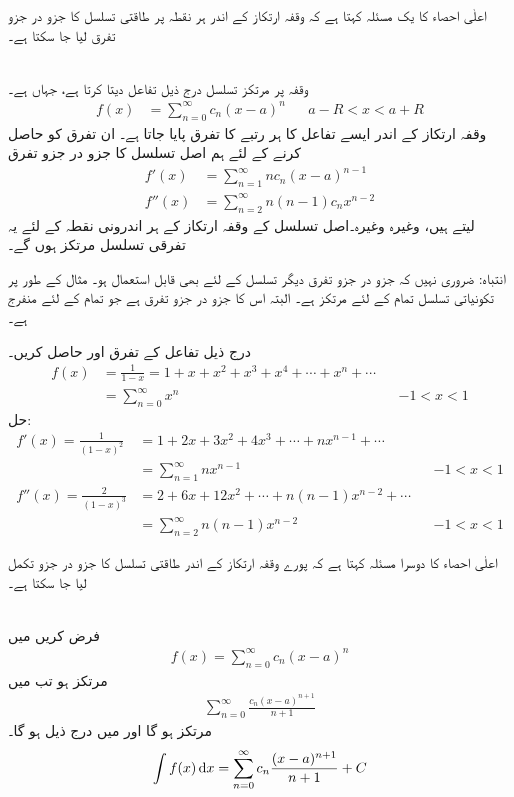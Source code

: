 اعلٰی احصاء کا یک مسئلہ کہتا ہے کہ وقفہ ارتکاز کے اندر ہر نقطہ پر طاقتی تسلسل کا جزو در جزو تفرق لیا جا سکتا ہے۔

\\
وقفہ   پر مرتکز تسلسل  درج ذیل تفاعل  دیتا کرتا ہے، جہاں  ہے۔
\begin{align*}
f(x)&=\sum_{n=0}^{\infty}c_n(x-a)^n&&a-R<x<a+R
\end{align*}
وقفہ ارتکاز کے اندر ایسے تفاعل کا ہر رتبے کا تفرق پایا جاتا ہے۔ ان تفرق کو حاصل کرنے کے لئے ہم اصل تسلسل کا جزو در جزو تفرق
\begin{align*}
f'(x)&=\sum_{n=1}^{\infty}nc_n(x-a)^{n-1}\\
f''(x)&=\sum_{n=2}^{\infty}n(n-1)c_nx^{n-2}
\end{align*}
لیتے ہیں، وغیرہ وغیرہ۔اصل تسلسل کے وقفہ ارتکاز کے ہر اندرونی نقطہ کے لئے یہ تفرقی تسلسل مرتکز ہوں گے۔

انتباہ: ضروری نہیں کہ جزو در جزو تفرق دیگر تسلسل کے لئے بھی قابل استعمال ہو۔ مثال کے طور پر تکونیاتی تسلسل  تمام  کے لئے مرتکز ہے۔ البتہ اس کا جزو در جزو تفرق   ہے جو تمام  کے لئے منفرج ہے۔

درج ذیل تفاعل  کے تفرق  اور  حاصل کریں۔
\begin{align*}
f(x)&=\frac{1}{1-x}=1+x+x^2+x^3+x^4+\cdots+x^n+\cdots\\
&=\sum_{n=0}^{\infty}x^n&&-1<x<1
\end{align*}
حل:\quad
\begin{align*}
f'(x)=\frac{1}{(1-x)^2}&=1+2x+3x^2+4x^3+\cdots+nx^{n-1}+\cdots\\
&=\sum_{n=1}^{\infty}nx^{n-1}&&-1<x<1\\
f''(x)=\frac{2}{(1-x)^3}&=2+6x+12x^2+\cdots+n(n-1)x^{n-2}+\cdots\\
&=\sum_{n=2}^{\infty}n(n-1)x^{n-2}&&-1<x<1
\end{align*}

اعلٰی احصاء کا دوسرا مسئلہ کہتا ہے کہ پورے وقفہ ارتکاز کے اندر  طاقتی تسلسل کا جزو در جزو تکمل لیا جا سکتا ہے۔

\\
فرض کریں  میں 
\begin{align*}
f(x)=\sum_{n=0}^{\infty}c_n(x-a)^n
\end{align*}
مرتکز ہو تب  میں 
\begin{align*}
\sum_{n=0}^{\infty}\frac{c_n(x-a)^{n+1}}{n+1}
\end{align*}
مرتکز ہو گا  اور  میں درج ذیل ہو گا۔
\begin{align*}
\int f(x)\dif x=\sum_{n=0}^{\infty}c_n\frac{(x-a)^{n+1}}{n+1}+C
\end{align*}

